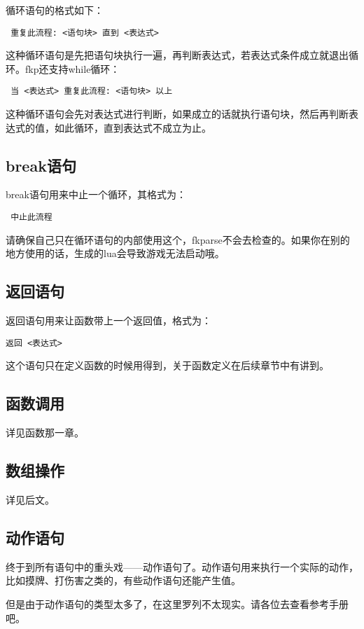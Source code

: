循环语句的格式如下：

\begin{verbatim}
 重复此流程: <语句块> 直到 <表达式>
\end{verbatim}

这种循环语句是先把语句块执行一遍，再判断表达式，若表达式条件成立就退出循环。fkp还支持while循环：

\begin{verbatim}
 当 <表达式> 重复此流程: <语句块> 以上
\end{verbatim}

这种循环语句会先对表达式进行判断，如果成立的话就执行语句块，然后再判断表达式的值，如此循环，直到表达式不成立为止。

\subsection{break语句}

break语句用来中止一个循环，其格式为：

\begin{verbatim}
 中止此流程
\end{verbatim}

请确保自己只在循环语句的内部使用这个，fkparse不会去检查的。如果你在别的地方使用的话，生成的lua会导致游戏无法启动哦。

\subsection{返回语句}

返回语句用来让函数带上一个返回值，格式为：

\begin{verbatim}
返回 <表达式>
\end{verbatim}

这个语句只在定义函数的时候用得到，关于函数定义在后续章节中有讲到。

\subsection{函数调用}

详见函数那一章。

\subsection{数组操作}

详见后文。

\subsection{动作语句}

终于到所有语句中的重头戏——动作语句了。动作语句用来执行一个实际的动作，比如摸牌、打伤害之类的，有些动作语句还能产生值。

但是由于动作语句的类型太多了，在这里罗列不太现实。请各位去查看参考手册吧。

